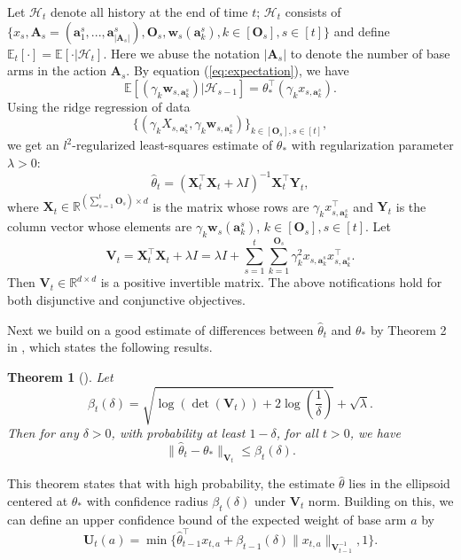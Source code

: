 \documentclass{article}
\newcommand{\EE}{\mathbb{E}}
\newcommand{\RR}{\mathbb{R}}
\newcommand{\bA}{\mathbf{A}}
\newcommand{\ba}{\mathbf{a}}
\newcommand{\bO}{\mathbf{O}}
\newcommand{\bU}{\mathbf{U}}
\newcommand{\bV}{\mathbf{V}}
\newcommand{\bw}{\mathbf{w}}
\newcommand{\bX}{\mathbf{X}}
\newcommand{\bY}{\mathbf{Y}}
\newcommand{\cH}{\mathcal{H}}
\newcommand{\abs}[1]{\left| #1 \right|}
\newcommand{\norm}[1]{\| #1 \|}
\newtheorem{theorem}{Theorem}[section]
\begin{document}
Let $\cH_t$ denote all history at the end of time $t$; $\cH_t$ consists of $\{x_s, \bA_s = (\ba_{1}^s,...,\ba_{\abs{\bA_s}}^s), \bO_s, \bw_s(\ba_k^s), k \in[\bO_s], s\in[t] \}$ and define $\EE_t[\cdot] = \EE[\cdot | \cH_t]$. Here we abuse the notation $\abs{\bA_s}$ to denote the number of base arms in the action $\bA_s$. By equation (\ref{eq:expectation}), we have 
$$
\EE[(\gamma_k \bw_{s,\ba_k^s}) | \cH_{s-1}] = \theta_*^{\top} (\gamma_k x_{s,\ba_k^s}).
$$
Using the ridge regression of data 
$$
\{(\gamma_k X_{s,\ba_k^s}, \gamma_k \bw_{s,\ba_k^s})\}_{k \in[\bO_s], s\in[t]},
$$
we get an $l^2$-regularized least-squares estimate of $\theta_*$ with regularization parameter $\lambda > 0$:
\begin{equation}
\hat{\theta}_t = (\bX_t^{\top}\bX_t + \lambda I)^{-1} \bX_t^{\top} \bY_t,
\end{equation}
where $\bX_t \in \RR^{(\sum_{s=1}^{t}\bO_s) \times d}$ is the matrix whose rows are $\gamma_k x_{s,\ba_k^s}^{\top}$ and $\bY_t$ is the column vector whose elements are $\gamma_k \bw_s(\ba_k^s)$, $k \in[\bO_s], s\in[t]$. Let
$$
\bV_t = \bX_t^{\top} \bX_t + \lambda I = \lambda I + \sum_{s=1}^{t} \sum_{k=1}^{\bO_s} \gamma_k^2 x_{s,\ba_k^s}x_{s,\ba_k^s}^{\top}.
$$
Then $\bV_t \in \RR^{d \times d}$ is a positive invertible matrix. The above notifications hold for both disjunctive and conjunctive objectives.

Next we build on a good estimate of differences between $\hat{\theta}_t$ and $\theta_*$ by Theorem 2 in \cite{abbasi2011improved}, which states the following results.
	
\begin{theorem}[\cite{abbasi2011improved}]
\label{thm:theta_estimate}
Let 
$$
\beta_{t}(\delta) = \sqrt{\log(\det(\bV_{t})) + 2 \log(\frac{1}{\delta})} + \sqrt{\lambda}.
$$
Then for any $\delta > 0$, with probability at least $1 - \delta$, for all $t > 0$, we have
\begin{equation}
\label{eq:estimateTheta}
\norm{\hat{\theta}_t - \theta_{\ast}}_{\bV_{t}} \leq \beta_{t}(\delta).
\end{equation}
\end{theorem}

This theorem states that with high probability, the estimate $\hat{\theta}$ lies in the ellipsoid centered at $\theta_*$  with confidence radius $\beta_t(\delta)$ under $\bV_t$ norm. Building on this, we can define an upper confidence bound of the expected weight of base arm $a$ by
\begin{equation}
\bU_t(a) = \min\{\hat{\theta}_{t-1}^{\top}x_{t,a} + \beta_{t-1}(\delta)\norm{x_{t,a}}_{\bV_{t-1}^{-1}}, 1\}.
\end{equation}
\end{document}
